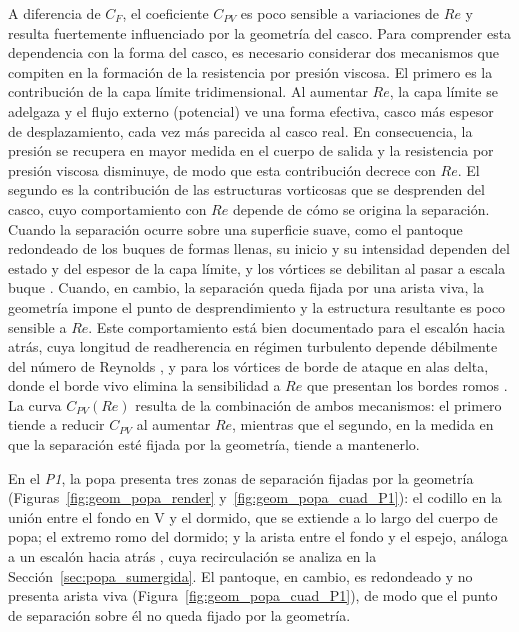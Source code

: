 A diferencia de $C_F$, el coeficiente $C_{PV}$ es poco sensible a variaciones 
de $Re$ y resulta fuertemente influenciado por la geometría del casco. Para 
comprender esta dependencia con la forma del casco, es necesario considerar 
dos mecanismos que compiten en la formación de la resistencia por presión 
viscosa. El primero es la contribución de la capa límite tridimensional. Al 
aumentar $Re$, la capa límite se adelgaza y el flujo externo (potencial) ve 
una forma efectiva, casco más espesor de desplazamiento, cada vez más 
parecida al casco real. En consecuencia, la presión se recupera en mayor 
medida en el cuerpo de salida y la resistencia por presión viscosa 
disminuye, de modo que esta contribución decrece con $Re$. El segundo es la 
contribución de las estructuras vorticosas que se desprenden del casco, cuyo 
comportamiento con $Re$ depende de cómo se origina la separación. Cuando la 
separación ocurre sobre una superficie suave, como el pantoque redondeado de 
los buques de formas llenas, su inicio y su intensidad dependen del estado y 
del espesor de la capa límite, y los vórtices se debilitan al pasar a escala 
buque \citep{ittc_nominal_wake}. Cuando, en cambio, la separación queda 
fijada por una arista viva, la geometría impone el punto de desprendimiento y 
la estructura resultante es poco sensible a $Re$. Este comportamiento está 
bien documentado para el escalón hacia atrás, cuya longitud de readherencia 
en régimen turbulento depende débilmente del número de Reynolds 
\citep{armaly1983bfs, adams_johnston1988}, y para los vórtices de borde de 
ataque en alas delta, donde el borde vivo elimina la sensibilidad a $Re$ que 
presentan los bordes romos \citep{luckring2002}. La curva $C_{PV}(Re)$ 
resulta de la combinación de ambos mecanismos: el primero tiende a reducir 
$C_{PV}$ al aumentar $Re$, mientras que el segundo, en la medida en que la 
separación esté fijada por la geometría, tiende a mantenerlo.

En el \textit{P1}, la popa presenta tres zonas de separación fijadas por la 
geometría (Figuras~\ref{fig:geom_popa_render} y~\ref{fig:geom_popa_cuad_P1}): 
el codillo en la unión entre el fondo en V y el dormido, que se extiende a lo 
largo del cuerpo de popa; el extremo romo del dormido; y la arista entre el 
fondo y el espejo, análoga a un escalón hacia atrás \citep{korkmaz_wetted_transom}, 
cuya recirculación se analiza en la Sección~\ref{sec:popa_sumergida}. El 
pantoque, en cambio, es redondeado y no presenta arista viva 
(Figura~\ref{fig:geom_popa_cuad_P1}), de modo que el punto de separación 
sobre él no queda fijado por la geometría.

